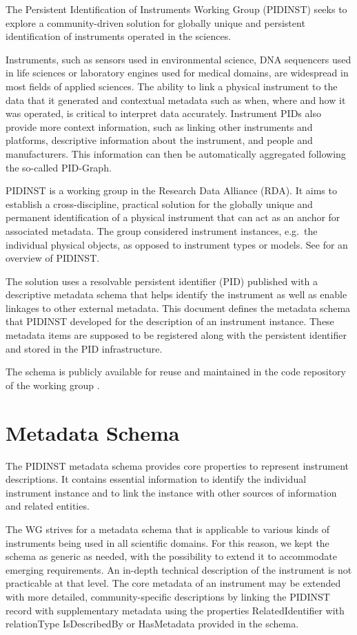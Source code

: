 \documentclass[titlepage=true,twoside=false,DIV=13]{scrartcl}
\begin{document}
The Persistent Identification of Instruments Working Group (PIDINST)
seeks to explore a commu\-nity-driven solution for globally unique and
persistent identification of instruments operated in the sciences.

Instruments, such as sensors used in environmental science, DNA
sequencers used in life sciences or laboratory engines used for
medical domains, are widespread in most fields of applied sciences.
The ability to link a physical instrument to the data that it
generated and contextual metadata such as when, where and how it was
operated, is critical to interpret data accurately.  Instrument PIDs
also provide more context information, such as linking other
instruments and platforms, descriptive information about the
instrument, and people and manufacturers.  This information can then
be automatically aggregated following the so-called PID-Graph.

PIDINST is a working group in the Research Data Alliance (RDA).  It
aims to establish a cross-discipline, practical solution for the
globally unique and permanent identification of a physical instrument
that can act as an anchor for associated metadata.  The group
considered instrument instances, e.g.\ the individual physical
objects, as opposed to instrument types or models.  See
\cite{pidinst2020} for an overview of PIDINST.

The solution uses a resolvable persistent identifier (PID) published
with a descriptive metadata schema that helps identify the instrument
as well as enable linkages to other external metadata.  This document
defines the metadata schema that PIDINST developed for the description
of an instrument instance.  These metadata items are supposed to be
registered along with the persistent identifier and stored in the PID
infrastructure.

The schema is publicly available for reuse and maintained in the code
repository of the working group \cite{pidinst:github}.

\section{Metadata Schema}
\label{schema}

The PIDINST metadata schema provides core properties to represent
instrument descriptions.  It contains essential information to
identify the individual instrument instance and to link the instance
with other sources of information and related entities.

The WG strives for a metadata schema that is applicable to various
kinds of instruments being used in all scientific domains.  For this
reason, we kept the schema as generic as needed, with the possibility
to extend it to accommodate emerging requirements.  An in-depth
technical description of the instrument is not practicable at that
level.  The core metadata of an instrument may be extended with more
detailed, community-specific descriptions by linking the PIDINST
record with supplementary metadata using the properties
RelatedIdentifier with relationType IsDescribedBy or HasMetadata
provided in the schema.
\end{document}

